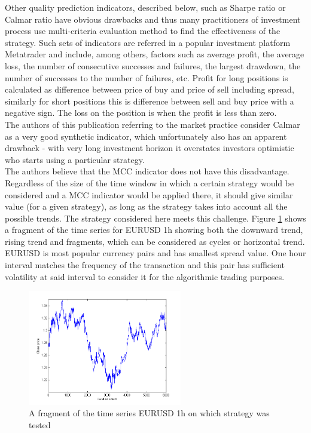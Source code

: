 \documentclass{jtacs}
\begin{document}
Other quality prediction indicators, described below, such as Sharpe ratio or Calmar ratio have obvious drawbacks and thus many practitioners of investment process use multi-criteria evaluation method to find the effectiveness of the strategy. Such sets of indicators are referred in a popular investment platform Metatrader \cite{wang} and include, among others, factors such as average profit, the average loss, the number of consecutive successes and failures, the largest drawdown,  the number of successes to the number of failures, etc. Profit for long positions is calculated as difference between price of buy and price of sell including spread, similarly for short positions this is difference between sell and buy price with a negative sign. The loss on the position is when the profit is less than zero.\\
The authors of this publication referring to the market practice consider Calmar \cite{sinclare} as a very good synthetic indicator, which unfortunately also has an apparent drawback - with very long investment horizon it overstates investors optimistic who starts using a particular strategy.\\
The authors believe that the MCC indicator does not have this disadvantage. Regardless of the size of the time window in which a certain strategy would be considered and a MCC indicator would be applied there, it should give similar value (for a given strategy), as long as the strategy takes into account all the possible trends. The strategy considered here meets this challenge. Figure \ref{rys1} shows a fragment of the time series for EURUSD 1h showing both the downward trend, rising trend and fragments, which can be considered as cycles or horizontal trend. EURUSD is most popular currency pairs and has smallest spread value. One hour interval matches the frequency of the transaction and this pair has sufficient volatility at said interval to consider it for the algorithmic trading purposes. 
\begin{figure}[ht]
\centering
\includegraphics[width = 0.6\textwidth]{pictures/researched_data.png}
\caption{A fragment of the time series EURUSD 1h on which strategy was tested}
\label{rys1}
\end{figure}
\FloatBarrier
\end{document}
